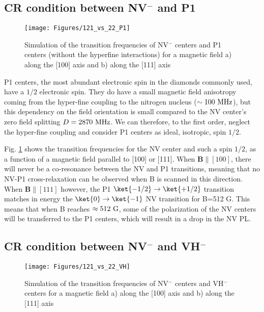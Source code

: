 \documentclass[a4paper,11pt]{report}
\begin{document}
\subsection{CR condition between NV$^-$ and P1}

\begin{figure}[h]
\centering
\texttt{[image: Figures/121\_vs\_22\_P1]}
\caption{Simulation of the transition frequencies of NV$^-$ centers and P1 centers (without the hyperfine interactions) for a magnetic field a) along the [100] axis and b) along the [111] axis}
\label{121 vs 22 P1}
\end{figure}

P1 centers, the most abundant electronic spin in the diamonds commonly used, have a $1/2$ electronic spin. They do have a small magnetic field anisotropy coming from the hyper-fine coupling to the nitrogen nucleus ($\sim 100\ \rm MHz$), but this dependency on the field orientation is small compared to the NV center's zero field splitting $D=2870\ \rm MHz$. We can therefore, to the first order, neglect the hyper-fine coupling and consider P1 centers as ideal, isotropic, spin $1/2$.

Fig. \ref{121 vs 22 P1} shows the transition frequencies for the NV center and such a spin $1/2$, as a function of a magnetic field parallel to [100] or [111]. When $\mathbf{B} \parallel [100]$, there will never be a co-resonance between the NV and P1 transitions, meaning that no NV-P1 cross-relaxation can be observed when B is scanned in this direction. When $\mathbf{B} \parallel [111]$ however, the P1 $\ket{-1/2} \to \ket{+1/2}$ transition matches in energy the $\ket{0}\to\ket{-1}$ NV transition for B=512 G. This means that when B reaches $\approx 512\ \rm G$, some of the polarization of the NV centers will be transferred to the P1 centers, which will result in a drop in the NV PL. 

\subsection{CR condition between NV$^-$ and VH$^-$}

\begin{figure}[h]
\centering
\texttt{[image: Figures/121\_vs\_22\_VH]}
\caption{Simulation of the transition frequencies of NV$^-$ centers and VH$^-$ centers for a magnetic field a) along the [100] axis and b) along the [111] axis}
\label{121 vs 22 VH}
\end{figure}
\end{document}
